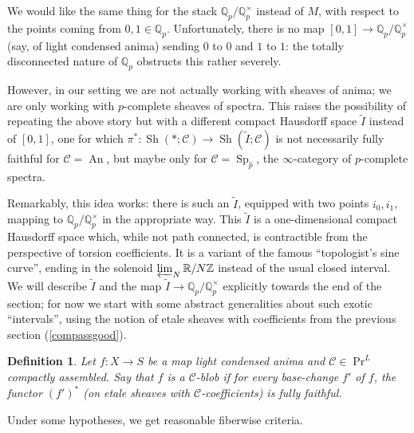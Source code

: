 \documentclass[12pt]{article}
\newtheorem{definition}[theorem]{Definition}
\newcommand{\on}{\operatorname}
\newcommand{\mc}{\mathcal}
\begin{document}
We would like the same thing for the stack $\mathbb{Q}_p/\mathbb{Q}_p^\times$ instead of $M$, with respect to the points coming from $0,1\in\mathbb{Q}_p$.  Unfortunately, there is no map $[0,1]\rightarrow \mathbb{Q}_p/\mathbb{Q}_p^\times$ (say, of light condensed anima) sending $0$ to $0$ and $1$ to $1$: the totally disconnected nature of $\mathbb{Q}_p$ obstructs this rather severely.

However, in our setting we are not actually working with sheaves of anima; we are only working with $p$-complete sheaves of spectra.  This raises the possibility of repeating the above story but with a different compact Hausdorff space $\widetilde{I}$ instead of $[0,1]$, one for which $\pi^\ast:\on{Sh}(\ast;\mathcal{C})\rightarrow\on{Sh}(\widetilde{I};\mathcal{C})$ is not necessarily fully faithful for $\mathcal{C}=\on{An}$, but maybe only for $\mathcal{C}=\operatorname{Sp}_{\hat{p}}$, the $\infty$-category of $p$-complete spectra.

Remarkably, this idea works: there is such an $\widetilde{I}$, equipped with two points $i_0,i_1$, mapping to $\mathbb{Q}_p/\mathbb{Q}_p^\times$ in the appropriate way.  This $\widetilde{I}$ is a one-dimensional compact Hausdorff space which, while not path connected, is contractible from the perspective of torsion coefficients.  It is a variant of the famous ``topologist's sine curve'', ending in the solenoid $\varprojlim_N\mathbb{R}/N\mathbb{Z}$ instead of the usual closed interval.  We will describe $\widetilde{I}$ and the map $\widetilde{I}\rightarrow\mathbb{Q}_p/\mathbb{Q}_p^\times$ explicitly towards the end of the section; for now we start with some abstract generalities about such exotic ``intervals'', using the notion of etale sheaves with coefficients from the previous section (\ref{compassgood}).

\begin{definition}
Let $f:X\to S$ be a map light condensed anima and $\mathcal{C}\in\on{Pr}^L$ compactly assembled.  Say that $f$ is a \emph{$\mc{C}$-blob} if for every base-change $f'$ of $f$, the functor $(f')^\ast$ (on etale sheaves with $\mc{C}$-coefficients) is fully faithful.
\end{definition}

Under some hypotheses, we get reasonable fiberwise criteria.
\end{document}
